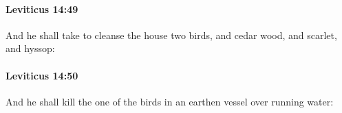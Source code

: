 		\paragraph{Leviticus 14:49} %
			\label{LEVITICUS-14-49}

			And he shall take to cleanse the house two birds, and cedar wood, and scarlet, and hyssop:


		\paragraph{Leviticus 14:50} %
			\label{LEVITICUS-14-50}

			And he shall kill the one of the birds in an earthen vessel over running water:


